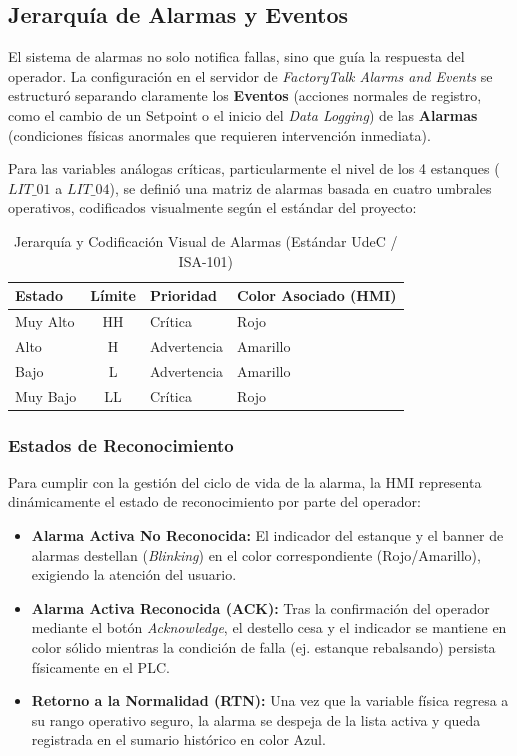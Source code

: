 \subsection{Jerarquía de Alarmas y Eventos}
El sistema de alarmas no solo notifica fallas, sino que guía la respuesta del operador. La configuración en el servidor de \textit{FactoryTalk Alarms and Events} se estructuró separando claramente los \textbf{Eventos} (acciones normales de registro, como el cambio de un Setpoint o el inicio del \textit{Data Logging}) de las \textbf{Alarmas} (condiciones físicas anormales que requieren intervención inmediata).

Para las variables análogas críticas, particularmente el nivel de los 4 estanques ($LIT\_01$ a $LIT\_04$), se definió una matriz de alarmas basada en cuatro umbrales operativos, codificados visualmente según el estándar del proyecto:

\begin{table}[h]
\centering
\caption{Jerarquía y Codificación Visual de Alarmas (Estándar UdeC / ISA-101)}
\label{tab:alarmas}
\begin{tabular}{|l|c|l|l|}
\hline
\textbf{Estado} & \textbf{Límite} & \textbf{Prioridad} & \textbf{Color Asociado (HMI)} \\ \hline
Muy Alto & HH & Crítica & Rojo \\ \hline
Alto & H & Advertencia & Amarillo \\ \hline
Bajo & L & Advertencia & Amarillo \\ \hline
Muy Bajo & LL & Crítica & Rojo \\ \hline
\end{tabular}
\end{table}

\subsubsection{Estados de Reconocimiento}
Para cumplir con la gestión del ciclo de vida de la alarma, la HMI representa dinámicamente el estado de reconocimiento por parte del operador:
\begin{itemize}
    \item \textbf{Alarma Activa No Reconocida:} El indicador del estanque y el banner de alarmas destellan (\textit{Blinking}) en el color correspondiente (Rojo/Amarillo), exigiendo la atención del usuario.
    \item \textbf{Alarma Activa Reconocida (ACK):} Tras la confirmación del operador mediante el botón \textit{Acknowledge}, el destello cesa y el indicador se mantiene en color sólido mientras la condición de falla (ej. estanque rebalsando) persista físicamente en el PLC.
    \item \textbf{Retorno a la Normalidad (RTN):} Una vez que la variable física regresa a su rango operativo seguro, la alarma se despeja de la lista activa y queda registrada en el sumario histórico en color Azul.
\end{itemize}
